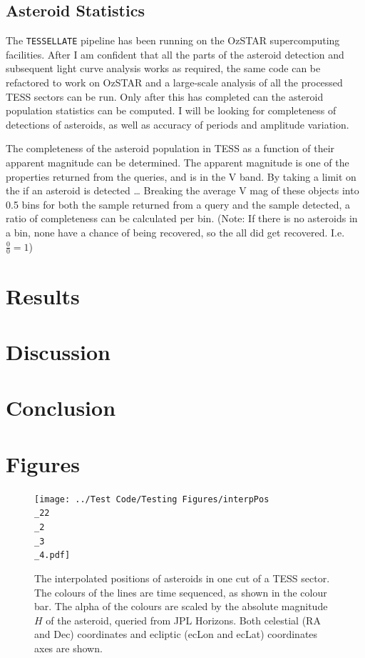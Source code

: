 \documentclass[12pt]{article}
\begin{document}
\subsection{Asteroid Statistics}\label{SubSec:StatMeth}

The \texttt{TESSELLATE} pipeline has been running on the OzSTAR supercomputing facilities.
After I am confident that all the parts of the asteroid detection and subsequent light curve analysis works as required, the same code can be refactored to work on OzSTAR and a large-scale analysis of all the processed TESS sectors can be run.
Only after this has completed can the asteroid population statistics can be computed.
I will be looking for completeness of detections of asteroids, as well as accuracy of periods and amplitude variation.

The completeness of the asteroid population in TESS as a function of their apparent magnitude can be determined.
The apparent magnitude is one of the properties returned from the queries, and is in the V band.
By taking a limit on the if an asteroid is detected \dots %
Breaking the average V mag of these objects into \qty{0.5}{\mag} bins for both the sample returned from a query and the sample detected, a ratio of completeness can be calculated per bin.
(Note: If there is no asteroids in a bin, none have a chance of being recovered, so the all did get recovered. I.e. $\frac{0}{0}=1$)


\section{Results}\label{Sec:Res}
\section{Discussion}\label{Sec:Disc}
\section{Conclusion}\label{Sec:Conc}

\section{Figures}

\begin{figure}
  \centering
  \texttt{[image: ../Test Code/Testing Figures/interpPos\\\_22\\\_2\\\_3\\\_4.pdf]}
  \caption[Interpolated positions of asteroids]{The interpolated positions of asteroids in one cut of a TESS sector.
    The colours of the lines are time sequenced, as shown in the colour bar.
    The alpha of the colours are scaled by the absolute magnitude $H$ of the asteroid, queried from JPL Horizons.
    Both celestial (RA and Dec) coordinates and ecliptic (ecLon and ecLat) coordinates axes are shown.
  }
  \label{Fig:interpPos}
\end{figure}
\end{document}
